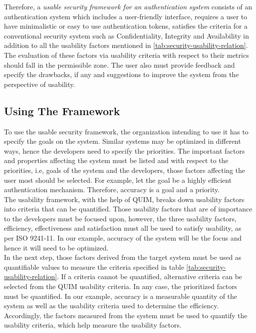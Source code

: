 Therefore, a \textit{usable security framework for an authentication system} consists of an authentication system which includes a user-friendly interface, requires a user to have minimalistic or easy to use authentication tokens, satisfies the criteria for a conventional security system such as Confidentiality, Integrity and Availability in addition to all the usability factors mentioned in \ref{tab:security-usability-relation}. The evaluation of these factors via usability criteria with respect to their metrics should fall in the permissible zone. The user also must provide feedback and specify the drawbacks, if any and suggestions to improve the system from the perspective of usability. 

\subsection{Using The Framework}
To use the usable security framework, the organization intending to use it has to specify the goals on the system. Similar systems may be optimized in different ways, hence the developers need to specify the priorities. The important factors and properties affecting the system must be listed and with respect to the priorities, i.e, goals of the system and the developers, those factors affecting the user most should be selected. For example, let the goal be a highly efficient authentication mechanism. Therefore, accuracy is a goal and a priority.\\
The usability framework, with the help of QUIM, breaks down usability factors into criteria that can be quantified. Those usability factors that are of importance to the developers must be focused upon, however, the three usability factors, efficiency, effectiveness and satisfaction must all be used to satisfy usability, as per ISO 9241-11. In our example, accuracy of the system will be the focus and hence it will need to be optimized.\\
In the next step, those factors derived from the target system must be used as quantifiable values to measure the criteria specified in table \ref{tab:security-usability-relation}. If a criteria cannot be quantified, alternative criteria can be selected from the QUIM usability criteria. In any case, the prioritized factors must be quantified. In our example, accuracy is a measurable quantity of the system as well as the usability criteria used to determine the efficiency.\\
Accordingly, the factors measured from the system must be used to quantify the usability criteria, which help measure the usability factors. 

